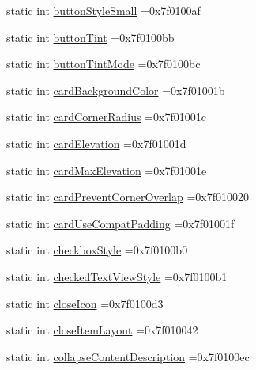 \begin{DoxyCompactItemize}
static int \hyperlink{classandroid_1_1support_1_1v7_1_1appcompat_1_1R_1_1attr_ab141da798cf5a334c63def755033b611}{button\+Style\+Small} =0x7f0100af
\item 
static int \hyperlink{classandroid_1_1support_1_1v7_1_1appcompat_1_1R_1_1attr_ae026a3a33583df459d33e3c0a97759f4}{button\+Tint} =0x7f0100bb
\item 
static int \hyperlink{classandroid_1_1support_1_1v7_1_1appcompat_1_1R_1_1attr_af9ff20ba654b1ae027744dc8217560e1}{button\+Tint\+Mode} =0x7f0100bc
\item 
static int \hyperlink{classandroid_1_1support_1_1v7_1_1appcompat_1_1R_1_1attr_a8af9587e6c5641d55965fddcd9ef548e}{card\+Background\+Color} =0x7f01001b
\item 
static int \hyperlink{classandroid_1_1support_1_1v7_1_1appcompat_1_1R_1_1attr_a99165bfd49949d6d8a5a78d2f2b26956}{card\+Corner\+Radius} =0x7f01001c
\item 
static int \hyperlink{classandroid_1_1support_1_1v7_1_1appcompat_1_1R_1_1attr_a2ab5dc49d1af3f3feb3a8a8a1c587ae0}{card\+Elevation} =0x7f01001d
\item 
static int \hyperlink{classandroid_1_1support_1_1v7_1_1appcompat_1_1R_1_1attr_ad913746d1d0e1d87003d6eac9574961c}{card\+Max\+Elevation} =0x7f01001e
\item 
static int \hyperlink{classandroid_1_1support_1_1v7_1_1appcompat_1_1R_1_1attr_a229805ad136083f3fc03e00ad650e071}{card\+Prevent\+Corner\+Overlap} =0x7f010020
\item 
static int \hyperlink{classandroid_1_1support_1_1v7_1_1appcompat_1_1R_1_1attr_a77f77f99bdcd93281a13980ef0141585}{card\+Use\+Compat\+Padding} =0x7f01001f
\item 
static int \hyperlink{classandroid_1_1support_1_1v7_1_1appcompat_1_1R_1_1attr_a8e18e9577e5b537ba3d5390332c30018}{checkbox\+Style} =0x7f0100b0
\item 
static int \hyperlink{classandroid_1_1support_1_1v7_1_1appcompat_1_1R_1_1attr_a042cf45307b147fc815136c31ed243eb}{checked\+Text\+View\+Style} =0x7f0100b1
\item 
static int \hyperlink{classandroid_1_1support_1_1v7_1_1appcompat_1_1R_1_1attr_a37078ec84b7d7129c2ee45c4a2639dc7}{close\+Icon} =0x7f0100d3
\item 
static int \hyperlink{classandroid_1_1support_1_1v7_1_1appcompat_1_1R_1_1attr_a8372686a9d3636588a945d0cfd5ac569}{close\+Item\+Layout} =0x7f010042
\item 
static int \hyperlink{classandroid_1_1support_1_1v7_1_1appcompat_1_1R_1_1attr_abfab8bcf888197819e6a627d3eeaa4ef}{collapse\+Content\+Description} =0x7f0100ec

\end{DoxyCompactItemize}
